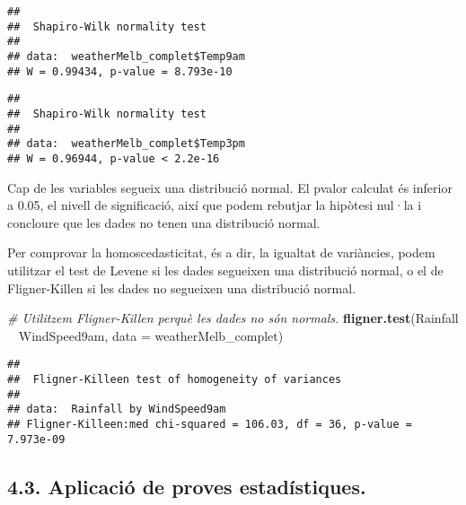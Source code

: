 \documentclass[
]{article}
\newenvironment{Shaded}{\begin{snugshade}}{\end{snugshade}}
\newcommand{\CommentTok}[1]{\textcolor[rgb]{0.56,0.35,0.01}{\textit{#1}}}
\newcommand{\DataTypeTok}[1]{\textcolor[rgb]{0.13,0.29,0.53}{#1}}
\newcommand{\KeywordTok}[1]{\textcolor[rgb]{0.13,0.29,0.53}{\textbf{#1}}}
\newcommand{\NormalTok}[1]{#1}
\newcommand{\OperatorTok}[1]{\textcolor[rgb]{0.81,0.36,0.00}{\textbf{#1}}}
\newcommand{\StringTok}[1]{\textcolor[rgb]{0.31,0.60,0.02}{#1}}
\begin{document}
\begin{verbatim}
## 
##  Shapiro-Wilk normality test
## 
## data:  weatherMelb_complet$Temp9am
## W = 0.99434, p-value = 8.793e-10
\end{verbatim}

\begin{Shaded}
\end{Shaded}

\begin{verbatim}
## 
##  Shapiro-Wilk normality test
## 
## data:  weatherMelb_complet$Temp3pm
## W = 0.96944, p-value < 2.2e-16
\end{verbatim}

Cap de les variables segueix una distribució normal. El pvalor calculat
és inferior a 0.05, el nivell de significació, així que podem rebutjar
la hipòtesi nul·la i concloure que les dades no tenen una distribució
normal.

Per comprovar la homoscedasticitat, és a dir, la igualtat de variàncies,
podem utilitzar el test de Levene si les dades segueixen una distribució
normal, o el de Fligner-Killen si les dades no segueixen una distribució
normal.

\begin{Shaded}
\begin{Highlighting}[]
\CommentTok{# Utilitzem Fligner-Killen perquè les dades no són normals.}
\KeywordTok{fligner.test}\NormalTok{(Rainfall }\OperatorTok{~}\StringTok{ }\NormalTok{WindSpeed9am, }\DataTypeTok{data =}\NormalTok{ weatherMelb_complet)}
\end{Highlighting}
\end{Shaded}

\begin{verbatim}
## 
##  Fligner-Killeen test of homogeneity of variances
## 
## data:  Rainfall by WindSpeed9am
## Fligner-Killeen:med chi-squared = 106.03, df = 36, p-value = 7.973e-09
\end{verbatim}

\hypertarget{aplicaciuxf3-de-proves-estaduxedstiques.}{%
\subsection{4.3. Aplicació de proves
estadístiques.}\label{aplicaciuxf3-de-proves-estaduxedstiques.}}
\end{document}
